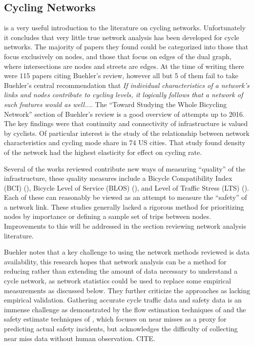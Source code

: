 \subsection{Cycling Networks}

\cite{buehler2016bikeway} is a very useful introduction to the literature on cycling networks. Unfortunately it concludes that very little true network analysis has been developed for cycle networks. The majority of papers they found could be categorized into those that focus exclusively on nodes, and those that focus on edges of the dual graph, where intersections are nodes and streets are edges. At the time of writing there were 115 papers citing Buehler's review, however all but 5 of them fail to take Buehler's central recommendation that \textit{If individual characteristics of a network's links and nodes contribute to cycling levels, it logically follows that a network of such features would as well...}. The ``Toward Studying the Whole Bicycling Network'' section of Buehler's review is a good overview of attempts up to 2016. The key findings were that continuity and connectivity of infrastructure is valued by cyclists. Of particular interest is the \cite{schoner2014missing} study of the relationship between network characteristics and cycling mode share in 74 US cities. That study found density of the network had the highest elasticity for effect on cycling rate. 

Several of the works reviewed contribute new ways of measuring ``quality'' of the infrastructure, these quality measures include a Bicycle Compatibility Index (BCI) (\cite{klobucar2007network}),  Bicycle Level of Service (BLOS) (\cite{lowry2012assessment}), and Level of Traffic Stress (LTS) (\cite{mekuria2012low}). Each of these can reasonably be viewed as an attempt to measure the ``safety'' of a network link. These studies generally lacked a rigorous method for prioritizing nodes by importance or defining a sample set of trips between nodes. Improvements to this will be addressed in the section reviewing network analysis literature. 

Buehler notes that a key challenge to using the network methods reviewed is data availability, this research hopes that network analysis can be a method for reducing rather than extending the amount of data necessary to understand a cycle network, as network statistics could be used to replace some empirical measurements as discussed below.  They further criticize the approaches as lacking empirical validation. Gathering accurate cycle traffic data and safety data is an immense challenge as demonstrated by the flow estimation techniques of \cite{gosse2014estimating} and the safety estimate techniques of \cite{puchades2018role}, which focuses on near misses as a proxy for predicting actual safety incidents, but acknowledges the difficulty of collecting near miss data without human observation. CITE. 


